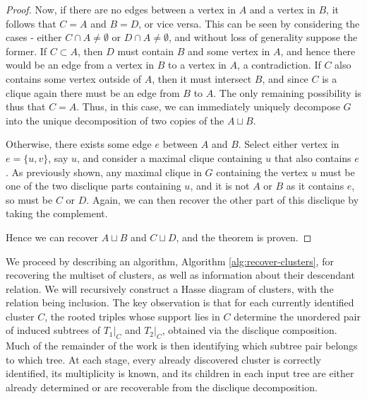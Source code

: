 \documentclass[12pt]{article}
\theoremstyle{definition}
\begin{document}
\begin{proof}
    Now, if there are no edges between a vertex in $A$ and a vertex in $B$, it follows that $C = A$ and $B = D$, or vice versa. This can be seen by considering the cases - either $C \cap A \ne \emptyset$ or $D \cap A \ne \emptyset$, and without loss of generality suppose the former. If $C \subset A$, then $D$ must contain $B$ and some vertex in $A$, and hence there would be an edge from a vertex in $B$ to a vertex in $A$, a contradiction. If $C$ also contains some vertex outside of $A$, then it must intersect $B$, and since $C$ is a clique again there must be an edge from $B$ to $A$. The only remaining possibility is thus that $C=A$. Thus, in this case, we can immediately uniquely decompose $G$ into the unique decomposition of two copies of the $A \sqcup B$.

    Otherwise, there exists some edge $e$ between $A$ and $B$. Select either vertex in $e=\{u,v\}$, say $u$, and consider a maximal clique containing $u$ that also contains $e$. As previously shown, any maximal clique in $G$ containing the vertex $u$ must be one of the two disclique parts containing $u$, and it is not $A$ or $B$ as it contains $e$, so must be $C$ or $D$. Again, we can then recover the other part of this disclique by taking the complement.

    Hence we can recover $A \sqcup B$ and $C \sqcup D$, and the theorem is proven.
\end{proof}

We proceed by describing an algorithm, Algorithm \ref{alg:recover-clusters}, for recovering the multiset of clusters, as well as information about their descendant relation. We will recursively construct a Hasse diagram of clusters, with the relation being inclusion. The key observation is that for each currently identified cluster $C$, the rooted triples whose support lies in $C$ determine the unordered pair of induced subtrees of $T_1|_C$ and $T_2|_C$, obtained via the disclique composition. Much of the remainder of the work is then identifying which subtree pair belongs to which tree. At each stage, every already discovered cluster is correctly identified, its multiplicity is known, and its children in each input tree are either already determined or are recoverable from the disclique decomposition.
\end{document}
